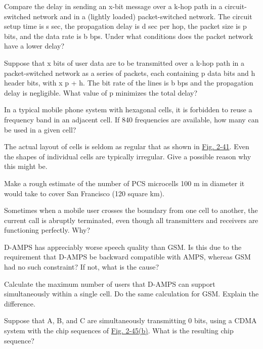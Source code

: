 \documentclass[b5paper,11pt]{memoir}
\begin{document}
{}

Compare the delay in sending an {x}-bit message over a {k}-hop path in a
circuit-switched network and in a (lightly loaded) packet-switched
network. The circuit setup time is {s} sec, the propagation delay is {d}
sec per hop, the packet size is {p} bits, and the data rate is {b} bps.
Under what conditions does the packet network have a lower delay?

{}

Suppose that {x} bits of user data are to be transmitted over a {k}-hop
path in a packet-switched network as a series of packets, each
containing {p} data bits and {h} header bits, with {x}
 {p} + {h.} The bit rate of the lines is {b}
bps and the propagation delay is negligible. What value of {p} minimizes
the total delay?

{}

In a typical mobile phone system with hexagonal cells, it is forbidden
to reuse a frequency band in an adjacent cell. If 840 frequencies are
available, how many can be used in a given cell?

{}

The actual layout of cells is seldom as regular that as shown in
\protect\hyperlink{0130661023_ch02lev1sec6.htmlux5cux23ch02fig41}{Fig.
2-41}. Even the shapes of individual cells are typically irregular. Give
a possible reason why this might be.

{}

Make a rough estimate of the number of PCS microcells 100 m in diameter
it would take to cover San Francisco (120 square km).

{}

Sometimes when a mobile user crosses the boundary from one cell to
another, the current call is abruptly terminated, even though all
transmitters and receivers are functioning perfectly. Why?

{}

D-AMPS has appreciably worse speech quality than GSM. Is this due to the
requirement that D-AMPS be backward compatible with AMPS, whereas GSM
had no such constraint? If not, what is the cause?

{}

Calculate the maximum number of users that D-AMPS can support
simultaneously within a single cell. Do the same calculation for GSM.
Explain the difference.

{}

Suppose that {A}, {B}, and {C} are simultaneously transmitting 0 bits,
using a CDMA system with the chip sequences of
\protect\hyperlink{0130661023_ch02lev1sec6.htmlux5cux23ch02fig45}{Fig.
2-45(b)}. What is the resulting chip sequence?
\end{document}
